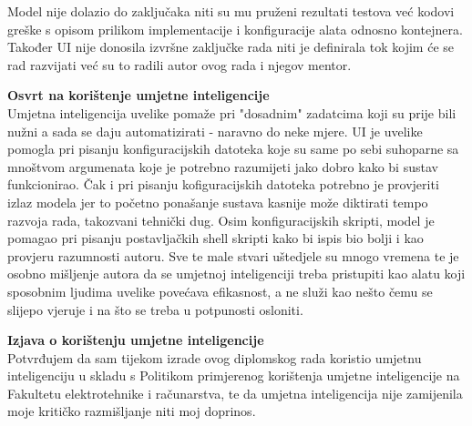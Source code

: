 \documentclass[diplomskirad]{fer}
\begin{document}
Model nije dolazio do zaključaka niti su mu pruženi rezultati testova već kodovi greške s opisom prilikom implementacije i konfiguracije alata odnosno kontejnera.
Također UI nije donosila izvršne zaključke rada niti je definirala tok kojim će se rad razvijati već su to radili autor ovog rada i njegov mentor.

\textbf{Osvrt na korištenje umjetne inteligencije} \\
Umjetna inteligencija uvelike pomaže pri "dosadnim" zadatcima koji su prije bili nužni a sada se daju automatizirati - naravno do neke mjere. UI je uvelike pomogla
pri pisanju konfiguracijskih datoteka koje su same po sebi suhoparne sa mnoštvom argumenata koje je potrebno razumijeti jako dobro kako bi sustav funkcionirao.
Čak i pri pisanju kofiguracijskih datoteka potrebno je provjeriti izlaz modela jer to početno ponašanje sustava kasnije može diktirati tempo razvoja rada, takozvani
tehnički dug.
Osim konfiguracijskih skripti, model je pomagao pri pisanju postavljačkih shell skripti kako bi ispis bio bolji i kao provjeru razumnosti autoru.
Sve te male stvari uštedjele su mnogo vremena te je osobno mišljenje autora da se umjetnoj inteligenciji treba pristupiti kao alatu koji sposobnim ljudima
uvelike povećava efikasnost, a ne služi kao nešto čemu se slijepo vjeruje i na što se treba u potpunosti osloniti.


\textbf{Izjava o korištenju umjetne inteligencije} \\
Potvrđujem da sam tijekom izrade ovog diplomskog rada koristio umjetnu inteligenciju u skladu s Politikom primjerenog korištenja umjetne inteligencije na 
Fakultetu elektrotehnike i računarstva, te da umjetna inteligencija nije zamijenila moje kritičko razmišljanje niti moj doprinos.
\end{document}
